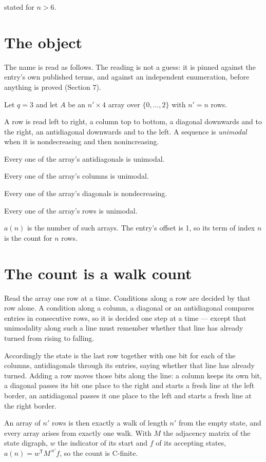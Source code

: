 \documentclass[11pt]{article}
\theoremstyle{definition}
\begin{document}
stated for $n > 6$.

\section{The object}

The name is read as follows. The reading is not a guess: it is pinned against the entry's own published terms, and against an independent enumeration, before anything is proved (Section 7).

Let $q = 3$ and let $A$ be an $n' \times 4$ array over $\{0,\dots,2\}$ with $n' = n$ rows.

A row is read left to right, a column top to bottom, a diagonal downwards and to the right, an antidiagonal downwards and to the left. A sequence is {\itshape unimodal} when it is nondecreasing and then nonincreasing.

Every one of the array's antidiagonals is unimodal.

Every one of the array's columns is unimodal.

Every one of the array's diagonals is nondecreasing.

Every one of the array's rows is unimodal.

$a(n)$ is the number of such arrays. The entry's offset is 1, so its term of index $n$ is the count for $n$ rows.

\section{The count is a walk count}

Read the array one row at a time. Conditions along a row are decided by that row alone. A condition along a column, a diagonal or an antidiagonal compares entries in consecutive rows, so it is decided one step at a time --- except that unimodality along such a line must remember whether that line has already turned from rising to falling.

Accordingly the state is the last row together with one bit for each of the columns, antidiagonals through its entries, saying whether that line has already turned. Adding a row moves those bits along the line: a column keeps its own bit, a diagonal passes its bit one place to the right and starts a fresh line at the left border, an antidiagonal passes it one place to the left and starts a fresh line at the right border.

An array of $n'$ rows is then exactly a walk of length $n'$ from the empty state, and every array arises from exactly one walk. With $M$ the adjacency matrix of the state digraph, $w$ the indicator of its start and $f$ of its accepting states, $a(n) = w^{\mathsf T}M^{\,n'}f$, so the count is C-finite.
\end{document}
